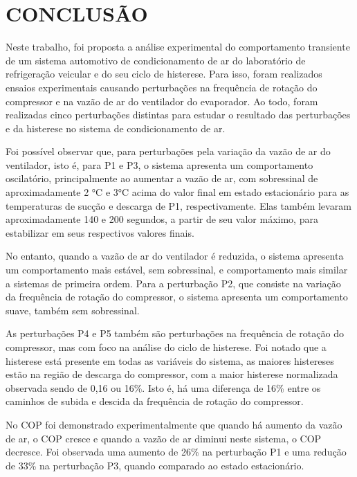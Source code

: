 \section{CONCLUSÃO}

Neste trabalho, foi proposta a análise experimental do comportamento transiente de um sistema automotivo de condicionamento de ar do laboratório de refrigeração veicular \textcite{reve2023} e do seu ciclo de histerese. Para isso, foram realizados ensaios experimentais causando perturbações na frequência de rotação do compressor e na vazão de ar do ventilador do evaporador. Ao todo, foram realizadas cinco perturbações distintas para estudar o resultado das perturbações e da histerese no sistema de condicionamento de ar. 

Foi possível observar que, para perturbações pela variação da vazão de ar do ventilador, isto é, para P1 e P3, o sistema apresenta um comportamento oscilatório, principalmente ao aumentar a vazão de ar, com sobressinal de aproximadamente 2 °C e 3°C acima do valor final em estado estacionário para as temperaturas de sucção e descarga de P1, respectivamente. Elas também levaram aproximadamente 140 e 200 segundos, a partir de seu valor máximo, para estabilizar em seus respectivos valores finais. 

No entanto, quando a vazão de ar do ventilador é reduzida, o sistema apresenta um comportamento mais estável, sem sobressinal, e comportamento mais similar a sistemas de primeira ordem. Para a perturbação P2, que consiste na variação da frequência de rotação do compressor, o sistema apresenta um comportamento suave, também sem sobressinal. 

As perturbações P4 e P5 também são perturbações na frequência de rotação do compressor, mas com foco na análise do ciclo de histerese. Foi notado que a histerese está presente em todas as variáveis do sistema, as maiores histereses estão na região de descarga do compressor, com a maior histerese normalizada observada sendo de 0,16 ou 16\%. Isto é, há uma diferença de 16\% entre os caminhos de subida e descida da frequência de rotação do compressor. 

No COP foi demonstrado experimentalmente que quando há aumento da vazão de ar, o COP cresce e quando a vazão de ar diminui neste sistema, o COP decresce. Foi observada uma aumento de 26\% na perturbação P1 e uma redução de 33\% na perturbação P3, quando comparado ao estado estacionário. 

